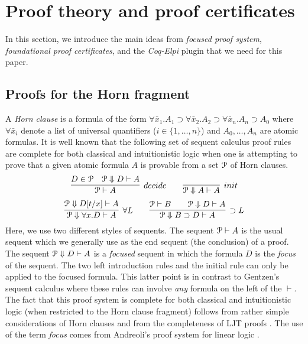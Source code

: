 \section{Proof theory and proof certificates}
\label{sec:three}

In this section, we introduce the main ideas from \emph{focused proof
  system}, \emph{foundational proof certificates}, and the
\emph{Coq-Elpi} plugin that we need for this paper.

\subsection{Proofs for the Horn fragment}
\label{ssec:focused}


A \emph{Horn clause} is a formula of the form $\forall \bar
x_1. A_1\supset \forall \bar x_2. A_2\supset \forall \bar
x_n. A_n\supset A_0$ where $\forall\bar x_i$ denote a list of
universal quantifiers ($i\in\{1,\ldots,n\}$) and $A_0,\ldots,A_n$ are
atomic formulas.  It is well known that the following set of sequent
calculus proof rules are complete for both classical and
intuitionistic logic when one is attempting to prove that a given
atomic formula $A$ is provable from a  set ${\mathcal P}$ of Horn
clauses. 
\[
  \infer[decide]{\Pscr\vdash A}
                {D \in \Pscr\quad \Pscr\Downarrow D\vdash A}
  \qquad
  \infer[init]{\Pscr\Downarrow A\vdash A}{}
\]
\[
  \infer[\forall L]{\Pscr\Downarrow\forall x. D\vdash A}
        {\Pscr\Downarrow D[t/x]\vdash A}
  \qquad
  \infer[\supset L]{\Pscr\Downarrow B\supset D\vdash A}
        {\Pscr\vdash B\qquad \Pscr\Downarrow D\vdash A}
\]
Here, we use two different styles of sequents.  The sequent
${\mathcal P}\vdash A$ is the usual sequent which we generally use as the end
sequent (the conclusion) of a proof.  The sequent ${\mathcal P}\Downarrow
D\vdash A$ is a \emph{focused} sequent in which the formula $D$ is the
\emph{focus} of the sequent.  The two left introduction rules and the
initial rule can only be applied to the focused formula.  This latter
point is in contrast to Gentzen's sequent calculus where these rules
can involve \emph{any} formula on the left of the $\vdash$.  The fact
that this proof system is complete for both classical and
intuitionistic logic (when restricted to the Horn clause fragment)
follows from rather simple considerations of Horn clauses
\cite{nadathur90jacm} and from the completeness of LJT proofs
\cite{Herbelin94}.  The use of the term \emph{focus} comes from
Andreoli's proof system for linear logic \cite{andreoli92jlc}.

